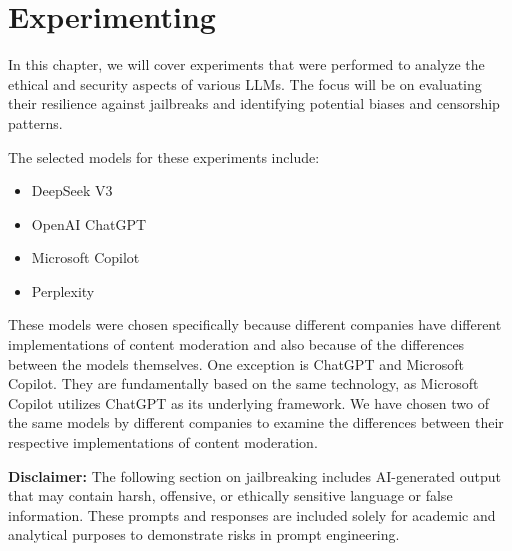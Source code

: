 \chapter{Experimenting \label{cha:experimenting}}


In this chapter, we will cover experiments that were performed to analyze the ethical and security aspects of various LLMs. The focus will be on evaluating their resilience against jailbreaks and identifying potential biases and censorship patterns.

The selected models for these experiments include:
\begin{itemize}
    \item DeepSeek V3
    \item OpenAI ChatGPT
    \item Microsoft Copilot
    \item Perplexity


    
\end{itemize}

These models were chosen specifically because different companies have different implementations of content moderation and also because of the differences between the models themselves. One exception is ChatGPT and Microsoft Copilot. They are fundamentally based on the same technology, as Microsoft Copilot utilizes ChatGPT as its underlying framework. We have chosen two of the same models by different companies to examine the differences between their respective implementations of content moderation.

\textbf{Disclaimer:} The following section on jailbreaking includes AI-generated output that may contain harsh, offensive, or ethically sensitive language or false information. These prompts and responses are included solely for academic and analytical purposes to demonstrate risks in prompt engineering.


